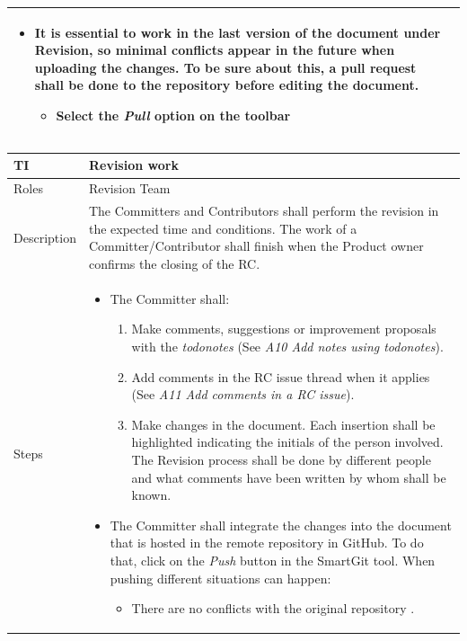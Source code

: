 \documentclass{template/openetcs_article}
\begin{document}
\begin{flushleft}
\begin{supertabular}{|m{2cm}|m{13cm}|}
\begin{itemize}
\begin{itemize}
\item It is essential to work in the last version of the document under Revision, so minimal conflicts appear in the future when uploading the changes. To be sure about this, a pull request shall be done to the repository before editing the document.
\begin{itemize}
\item Select the {\it Pull} option on the toolbar
\end{itemize}
\end{itemize}
\end{itemize}
\\\hline
\end{supertabular}
\end{flushleft}

\begin{flushleft}
\tablefirsthead{}
\tablehead{}
\tabletail{}
\tablelasttail{}
\begin{supertabular}{|m{2cm}|m{13cm}|}
\hline
{}
TI & 
Revision work
\\\hline
Roles &
Revision Team
\\\hline
Description &
The Committers and Contributors shall perform the revision in the expected time and conditions. The work of a Committer/Contributor shall finish when the Product owner confirms the closing of the RC.
\\\hline
Steps &
\begin{itemize}
\item The Committer shall:
\begin{enumerate}
\item Make comments, suggestions or improvement proposals with the {\it todonotes} (See {\it A10 Add notes using todonotes}).
\item Add comments in the RC issue thread when it applies (See {\it A11 Add comments in a RC issue}).
\item Make changes in the document. Each insertion shall be highlighted indicating the initials of the person involved. The Revision process shall be done by different people and what comments have been written by whom shall be known.
\end{enumerate}
\item The Committer shall integrate the changes into the document that is hosted in the remote repository in GitHub. To do that, click on the {\it Push} button in the SmartGit tool. When pushing different situations can happen:
\begin{itemize}
\item There are no conflicts with the original repository .

\end{itemize}
\end{itemize}
\end{supertabular}
\end{flushleft}
\end{document}
